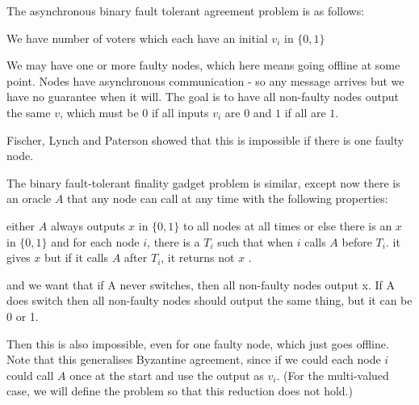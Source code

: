 \documentclass{article}
\begin{document}
The asynchronous binary fault tolerant agreement problem is as follows:

We have  number of voters which each have an initial $v_i$ in $\{0,1\}$

We may have one or more faulty nodes, which here means going offline at some point. Nodes have asynchronous communication - so any message arrives but we have no guarantee when it will.
The goal is to have all non-faulty nodes output the same $v$, which must be $0$ if all inputs $v_i$ are $0$ and $1$ if all are $1$.

Fischer, Lynch and Paterson\cite{flp} showed that this is impossible if there is one faulty node.

The binary fault-tolerant finality gadget problem is similar, except now there is an oracle $A$ that any node can call at any time with the following properties:

either $A$ always outputs $x$ in $\{0,1\}$ to all nodes at all times
or else there is an $x$ in $\{0,1\}$ and
for each node $i$, there is a $T_i$ such that when $i$ calls $A$ before $T_i$. it gives $x$ but if it calls $A$ after $T_i$, it returns not $x$ .

and we want that if A never switches, then all non-faulty nodes output x. If A does switch then all non-faulty nodes should output the same thing, but it can be 0 or 1. 

Then this is also impossible, even for one faulty node, which just goes offline. Note that this generalises Byzantine agreement, since if we could each node $i$ could call $A$ once at the start and use the output as $v_i$. (For the multi-valued case, we will define the problem so that this reduction does not hold.)
\end{document}
